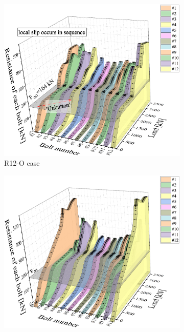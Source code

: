 \begin{figure}[htbp]
\centering
    \begin{subfigure}[t]{0.49\linewidth}
        \includegraphics[width=\linewidth]{imgs/ch5/R12-O-3d.eps}
        \caption{R12-O case}
        \label{fig-r12o3d}
    \end{subfigure}
    \hfill
    \begin{subfigure}[t]{0.49\linewidth}
        \includegraphics[width=\linewidth]{imgs/ch5/R12B2--3d.eps}

\end{subfigure}
\end{figure}
